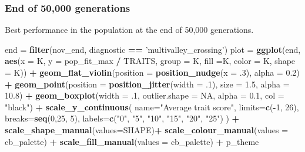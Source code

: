 \documentclass[]{book}
\newenvironment{Shaded}{\begin{snugshade}}{\end{snugshade}}
\newcommand{\DataTypeTok}[1]{\textcolor[rgb]{0.13,0.29,0.53}{#1}}
\newcommand{\DecValTok}[1]{\textcolor[rgb]{0.00,0.00,0.81}{#1}}
\newcommand{\FloatTok}[1]{\textcolor[rgb]{0.00,0.00,0.81}{#1}}
\newcommand{\KeywordTok}[1]{\textcolor[rgb]{0.13,0.29,0.53}{\textbf{#1}}}
\newcommand{\NormalTok}[1]{#1}
\newcommand{\OperatorTok}[1]{\textcolor[rgb]{0.81,0.36,0.00}{\textbf{#1}}}
\newcommand{\OtherTok}[1]{\textcolor[rgb]{0.56,0.35,0.01}{#1}}
\newcommand{\StringTok}[1]{\textcolor[rgb]{0.31,0.60,0.02}{#1}}
\begin{document}
\hypertarget{end-of-50000-generations-42}{%
\subsubsection{End of 50,000 generations}\label{end-of-50000-generations-42}}

Best performance in the population at the end of 50,000 generations.

\begin{Shaded}
\begin{Highlighting}[]
\NormalTok{end =}\StringTok{ }\KeywordTok{filter}\NormalTok{(nov_end, diagnostic }\OperatorTok{==}\StringTok{ 'multivalley_crossing'}\NormalTok{)}
\NormalTok{plot =}\StringTok{ }\KeywordTok{ggplot}\NormalTok{(end, }\KeywordTok{aes}\NormalTok{(}\DataTypeTok{x =}\NormalTok{ K, }\DataTypeTok{y =}\NormalTok{ pop_fit_max }\OperatorTok{/}\StringTok{ }\NormalTok{TRAITS, }\DataTypeTok{group =}\NormalTok{ K, }\DataTypeTok{fill =}\NormalTok{K, }\DataTypeTok{color =}\NormalTok{ K, }\DataTypeTok{shape =}\NormalTok{ K)) }\OperatorTok{+}
\StringTok{  }\KeywordTok{geom_flat_violin}\NormalTok{(}\DataTypeTok{position =} \KeywordTok{position_nudge}\NormalTok{(}\DataTypeTok{x =} \FloatTok{.3}\NormalTok{), }\DataTypeTok{alpha =} \FloatTok{0.2}\NormalTok{) }\OperatorTok{+}
\StringTok{  }\KeywordTok{geom_point}\NormalTok{(}\DataTypeTok{position =} \KeywordTok{position_jitter}\NormalTok{(}\DataTypeTok{width =} \FloatTok{.1}\NormalTok{), }\DataTypeTok{size =} \FloatTok{1.5}\NormalTok{, }\DataTypeTok{alpha =} \FloatTok{10.8}\NormalTok{) }\OperatorTok{+}
\StringTok{  }\KeywordTok{geom_boxplot}\NormalTok{(}\DataTypeTok{width =} \FloatTok{.1}\NormalTok{, }\DataTypeTok{outlier.shape =} \OtherTok{NA}\NormalTok{, }\DataTypeTok{alpha =} \FloatTok{0.1}\NormalTok{, }\DataTypeTok{col =} \StringTok{"black"}\NormalTok{) }\OperatorTok{+}
\StringTok{  }\KeywordTok{scale_y_continuous}\NormalTok{(}
    \DataTypeTok{name=}\StringTok{"Average trait score"}\NormalTok{,}
    \DataTypeTok{limits=}\KeywordTok{c}\NormalTok{(}\OperatorTok{-}\DecValTok{1}\NormalTok{, }\DecValTok{26}\NormalTok{),}
    \DataTypeTok{breaks=}\KeywordTok{seq}\NormalTok{(}\DecValTok{0}\NormalTok{,}\DecValTok{25}\NormalTok{, }\DecValTok{5}\NormalTok{),}
    \DataTypeTok{labels=}\KeywordTok{c}\NormalTok{(}\StringTok{"0"}\NormalTok{, }\StringTok{"5"}\NormalTok{, }\StringTok{"10"}\NormalTok{, }\StringTok{"15"}\NormalTok{, }\StringTok{"20"}\NormalTok{, }\StringTok{"25"}\NormalTok{)}
\NormalTok{  ) }\OperatorTok{+}
\StringTok{  }\KeywordTok{scale_shape_manual}\NormalTok{(}\DataTypeTok{values=}\NormalTok{SHAPE)}\OperatorTok{+}
\StringTok{  }\KeywordTok{scale_colour_manual}\NormalTok{(}\DataTypeTok{values =}\NormalTok{ cb_palette) }\OperatorTok{+}
\StringTok{  }\KeywordTok{scale_fill_manual}\NormalTok{(}\DataTypeTok{values =}\NormalTok{ cb_palette) }\OperatorTok{+}
\StringTok{  }\NormalTok{p_theme}


\end{Highlighting}
\end{Shaded}
\end{document}
